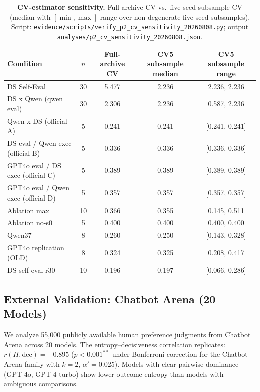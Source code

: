 \documentclass[11pt]{article}
\begin{document}
\begin{table}[t]
\centering
\caption{\textbf{CV-estimator sensitivity.} Full-archive CV vs.\ five-seed subsample CV (median with $[\min,\max]$ range over non-degenerate five-seed subsamples). Script: \texttt{evidence/scripts/verify\_p2\_cv\_sensitivity\_20260808.py}; output \texttt{analyses/p2\_cv\_sensitivity\_20260808.json}.}
\label{tab:cv_sens}
\small
\begin{tabular}{@{}lcccc@{}}
\toprule
Condition & $n$ & Full-archive CV & CV5 subsample median & CV5 subsample range \\
\midrule
DS Self-Eval & 30 & 5.477 & 2.236 & [2.236, 2.236] \\
DS x Qwen (qwen eval) & 30 & 2.306 & 2.236 & [0.587, 2.236] \\
Qwen x DS (official A) & 5 & 0.241 & 0.241 & [0.241, 0.241] \\
DS eval / Qwen exec (official B) & 5 & 0.336 & 0.336 & [0.336, 0.336] \\
GPT4o eval / DS exec (official C) & 5 & 0.389 & 0.389 & [0.389, 0.389] \\
GPT4o eval / Qwen exec (official D) & 5 & 0.357 & 0.357 & [0.357, 0.357] \\
Ablation max & 10 & 0.366 & 0.355 & [0.145, 0.511] \\
Ablation no-s0 & 5 & 0.400 & 0.400 & [0.400, 0.400] \\
Qwen37 & 8 & 0.260 & 0.250 & [0.143, 0.328] \\
GPT4o replication (OLD) & 8 & 0.324 & 0.325 & [0.208, 0.417] \\
DS self-eval r30 & 10 & 0.196 & 0.197 & [0.066, 0.286] \\
\bottomrule
\end{tabular}
\end{table}



\subsection{External Validation: Chatbot Arena (20 Models)}

We analyze 55,000 publicly available human preference judgments from Chatbot Arena across 20 models. The entropy--decisiveness correlation replicates: $r(H, \text{dec}) = -0.895$ ($p < 0.001^{**}$ under Bonferroni correction for the Chatbot Arena family with $k = 2$, $\alpha' = 0.025$). Models with clear pairwise dominance (GPT-4o, GPT-4-turbo) show lower outcome entropy than models with ambiguous comparisons.
\end{document}
